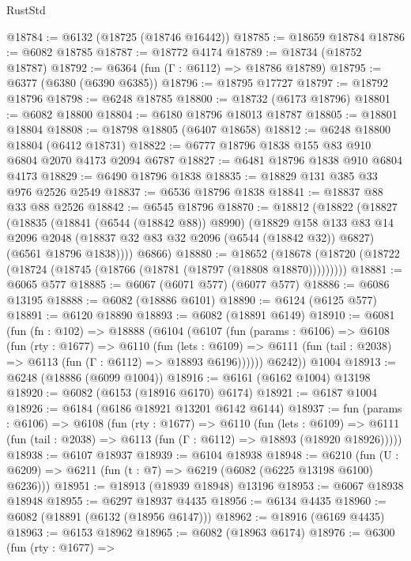 \begin{lexlean}{RustStd}
\begin{coremodule}
@18784 := @6132 (@18725 (@18746 @16442))
@18785 := @18659 @18784
@18786 := @6082 @18785
@18787 := @18772 @4174
@18789 := @18734 (@18752 @18787)
@18792 := @6364 (fun (Γ : @6112) => @18786 @18789)
@18795 := @6377 (@6380 (@6390 @6385))
@18796 := @18795 @17727
@18797 := @18792 @18796
@18798 := @6248 @18785
@18800 := @18732 (@6173 @18796)
@18801 := @6082 @18800
@18804 := @6180 @18796 @18013 @18787
@18805 := @18801 @18804
@18808 := @18798 @18805 (@6407 @18658)
@18812 := @6248 @18800 @18804 (@6412 @18731)
@18822 := @6777 @18796 @1838 @155 @83 @910 @6804 @2070 @4173 @2094 @6787
@18827 := @6481 @18796 @1838 @910 @6804 @4173
@18829 := @6490 @18796 @1838
@18835 := @18829 @131 @385 @33 @976 @2526 @2549
@18837 := @6536 @18796 @1838
@18841 := @18837 @88 @33 @88 @2526
@18842 := @6545 @18796
@18870 := @18812
    (@18822
      (@18827
        (@18835
          (@18841 (@6544 (@18842 @88)) @8990)
          (@18829
            @158
            @133
            @83
            @14
            @2096
            @2048
            (@18837 @32 @83 @32 @2096 (@6544 (@18842 @32)) @6827)
            (@6561 @18796 @1838))))
      @6866)
@18880 := @18652
    (@18678 (@18720 (@18722 (@18724 (@18745 (@18766 (@18781 (@18797 (@18808 @18870)))))))))
@18881 := @6065 @577
@18885 := @6067 (@6071 @577) (@6077 @577)
@18886 := @6086 @13195
@18888 := @6082 (@18886 @6101)
@18890 := @6124 (@6125 @577)
@18891 := @6120 @18890
@18893 := @6082 (@18891 @6149)
@18910 := @6081
    (fun (fn : @102) =>
    @18888
      (@6104
        (@6107
          (fun (params : @6106) =>
          @6108
            (fun (rty : @1677) =>
            @6110
              (fun (lets : @6109) =>
              @6111 (fun (tail : @2038) => @6113 (fun (Γ : @6112) => @18893 @6196))))))
        @6242))
    @1004
@18913 := @6248 (@18886 (@6099 @1004))
@18916 := @6161 (@6162 @1004) @13198
@18920 := @6082 (@6153 (@18916 @6170) @6174)
@18921 := @6187 @1004
@18926 := @6184 (@6186 @18921 @13201 @6142 @6144)
@18937 := fun (params : @6106) =>
  @6108
    (fun (rty : @1677) =>
    @6110
      (fun (lets : @6109) =>
      @6111 (fun (tail : @2038) => @6113 (fun (Γ : @6112) => @18893 (@18920 @18926)))))
@18938 := @6107 @18937
@18939 := @6104 @18938
@18948 := @6210
    (fun (U : @6209) => @6211 (fun (t : @7) => @6219 (@6082 (@6225 @13198 @6100) @6236)))
@18951 := @18913 (@18939 @18948) @13196
@18953 := @6067 @18938 @18948
@18955 := @6297 @18937 @4435
@18956 := @6134 @4435
@18960 := @6082 (@18891 (@6132 (@18956 @6147)))
@18962 := @18916 (@6169 @4435)
@18963 := @6153 @18962
@18965 := @6082 (@18963 @6174)
@18976 := @6300
    (fun (rty : @1677) =>

\end{coremodule}
\end{lexlean}

